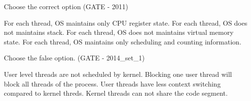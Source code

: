 

\begin{questyle}

  \question  Choose the correct option (GATE - 2011)

  \begin{choices}
    \choice For each thread, OS maintains only CPU register state.
    \choice For each thread, OS does not maintains  stack.
    \choice For each thread, OS does not maintains  virtual memory state.
    \choice For each thread, OS maintains only scheduling and counting information.
  \end{choices}


  \end{questyle}





\begin{questyle}

  \question  Choose the false option. (GATE - 2014\_set\_1)

  \begin{choices}
    \choice User level threads are not scheduled by kernel.
    \choice Blocking one user thread will block all threads of the process.
    \choice User threads have less context switching compared to kernel threds.
    \choice Kernel threads can not share the code segment.
  \end{choices}


  \end{questyle}

